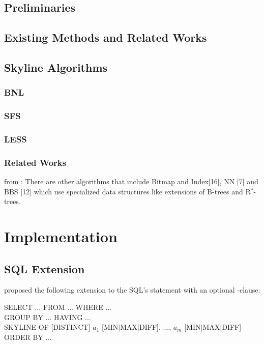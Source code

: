 \section{Preliminaries}
\section{Existing Methods and Related Works}
\section{Skyline Algorithms}
\subsection{BNL}
\subsection{SFS}
\subsection{LESS}

\subsection{Related Works}
from \citep{Chaudhuri2006}: 
 There are other algorithms that include Bitmap and Index[16], NN
[7] and BBS [12] which use specialized data structures like
extensions of B-trees and R$^*$-trees.

\chapter{Implementation}
\section{SQL Extension}

\citet{Borzsonyi2001} proposed the following extension to the SQL's  statement with an optional -clause:
\begin{sql}
SELECT ... FROM ... WHERE ... \\
GROUP BY ... HAVING ...       \\
SKYLINE OF \textnormal{[}DISTINCT\textnormal{]} $a_1$ \textnormal{[}MIN$|$MAX$|$DIFF\textnormal{]}, ..., $a_m$ \textnormal{[}MIN$|$MAX$|$DIFF\textnormal{]} \\
ORDER BY ...
\end{sql}

